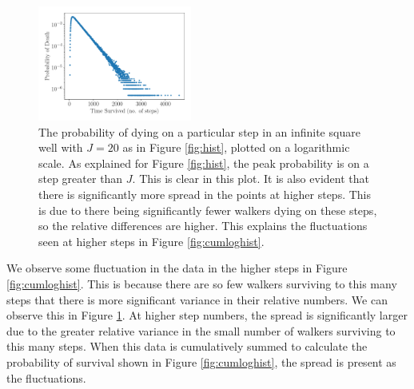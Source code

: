 \documentclass[journal]{IEEEtran}
\begin{document}
\begin{figure}%
  \begin{center}
    \includegraphics[width=0.45\textwidth]{images/line_plot.pdf}
    \caption{The probability of dying on a particular step in an infinite square
      well with $J=20$ as in Figure \ref{fig:hist}, plotted on a logarithmic
      scale. As explained for Figure \ref{fig:hist}, the peak probability is on
      a step greater than $J$. This is clear in this plot. It is also evident
      that there is significantly more spread in the points at higher
      steps. This is due to there being significantly fewer walkers dying on
      these steps, so the relative differences are higher. This explains the
      fluctuations seen at higher steps in Figure \ref{fig:cumloghist}.}
    \label{fig:loghist}
  \end{center}
\end{figure}

We observe some fluctuation in the data in the higher steps in Figure
\ref{fig:cumloghist}. This is because there are so few walkers surviving to this
many steps that there is more significant variance in their relative numbers. We
can observe this in Figure \ref{fig:loghist}. At higher step numbers, the spread
is significantly larger due to the greater relative variance in the small number
of walkers surviving to this many steps. When this data is cumulatively summed
to calculate the probability of survival shown in Figure \ref{fig:cumloghist},
the spread is present as the fluctuations.
\end{document}
